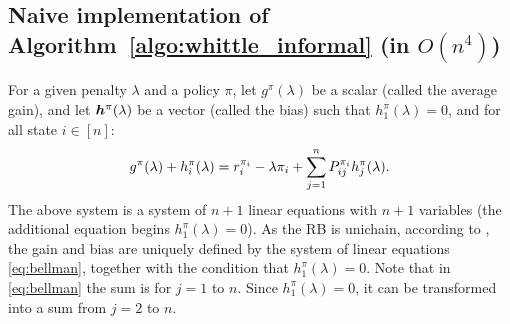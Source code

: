 \documentclass[acmsmall,screen,anonymous]{acmart}
\begin{document}
\subsection{Naive implementation of Algorithm~\ref{algo:whittle_informal} (in $O(n^4)$)}

For a given penalty $\lambda$ and a policy $\pi$, let $g^{\pi}(\lambda)$ be a scalar (called the average gain), and let $\boldsymbol{h}^{\pi}(\lambda)$ be a vector (called the bias) such that $h^\pi_1(\lambda)=0$, and for all state $i\in[n]:$
\begin{align}
    \label{eq:bellman}
    g^{\pi}(\lambda) + h^{\pi}_i(\lambda) = r_i^{\pi_i} -\lambda\pi_i + \sum_{j=1}^nP^{\pi_i}_{ij}h^{\pi}_j(\lambda).
\end{align}
The above system is a system of $n+1$ linear equations with $n+1$ variables (the additional equation begins $h_1^\pi(\lambda)=0$). As the RB is unichain, according to \cite{putermanMarkovDecisionProcesses1994}, the gain and bias are uniquely defined by the system of linear equations \eqref{eq:bellman}, together with the condition that $h_1^\pi(\lambda)=0$.  Note that in \eqref{eq:bellman} the sum is for $j=1$ to $n$. Since $h_1^\pi(\lambda)=0$, it can be transformed into a sum from $j=2$ to $n$. 
\end{document}

